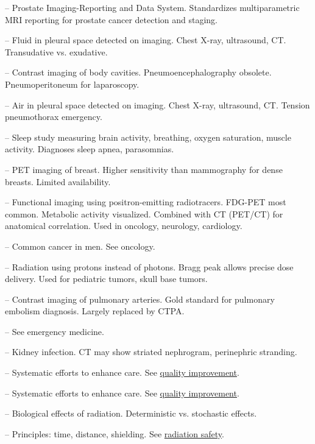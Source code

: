 -- Prostate Imaging-Reporting and Data System. Standardizes multiparametric MRI reporting for prostate cancer detection and staging.

-- Fluid in pleural space detected on imaging. Chest X-ray, ultrasound, CT. Transudative vs. exudative.

-- Contrast imaging of body cavities. Pneumoencephalography obsolete. Pneumoperitoneum for laparoscopy.

-- Air in pleural space detected on imaging. Chest X-ray, ultrasound, CT. Tension pneumothorax emergency.

-- Sleep study measuring brain activity, breathing, oxygen saturation, muscle activity. Diagnoses sleep apnea, parasomnias.


-- PET imaging of breast. Higher sensitivity than mammography for dense breasts. Limited availability.

-- Functional imaging using positron-emitting radiotracers. FDG-PET most common. Metabolic activity visualized. Combined with CT (PET/CT) for anatomical correlation. Used in oncology, neurology, cardiology.

-- Common cancer in men. See oncology.

-- Radiation using protons instead of photons. Bragg peak allows precise dose delivery. Used for pediatric tumors, skull base tumors.


-- Contrast imaging of pulmonary arteries. Gold standard for pulmonary embolism diagnosis. Largely replaced by CTPA.

-- See emergency medicine.

-- Kidney infection. CT may show striated nephrogram, perinephric stranding.

-- Systematic efforts to enhance care. See \hyperlink{Quality Improvement}{quality improvement}.

-- Systematic efforts to enhance care. See \hyperlink{Quality Improvement}{quality improvement}.

-- Biological effects of radiation. Deterministic vs. stochastic effects.

-- Principles: time, distance, shielding. See \hyperlink{Radiation Safety}{radiation safety}.


